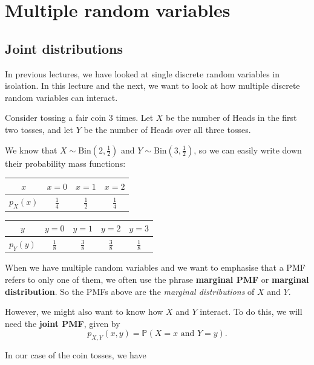 \documentclass[
  a4paper,
]{book}
\theoremstyle{definition}
\theoremstyle{definition}
\theoremstyle{definition}
\theoremstyle{definition}
\theoremstyle{remark}
\begin{document}
\hypertarget{L13-multi-rv}{%
\chapter{Multiple random variables}\label{L13-multi-rv}}

\hypertarget{joint}{%
\section{Joint distributions}\label{joint}}

In previous lectures, we have looked at single discrete random variables in isolation. In this lecture and the next, we want to look at how multiple discrete random variables can interact.

Consider tossing a fair coin 3 times. Let \(X\) be the number of Heads in the first two tosses, and let \(Y\) be the number of Heads over all three tosses.

We know that \(X \sim \text{Bin}(2, \frac12)\) and \(Y \sim \text{Bin}(3, \frac12)\), so we can easily write down their probability mass functions:

\begin{longtable}[]{@{}cccc@{}}
\toprule\noalign{}
\(x\) & \(x = 0\) & \(x = 1\) & \(x = 2\) \\
\midrule\noalign{}
\endhead
\bottomrule\noalign{}
\endlastfoot
\(p_X(x)\) & \(\frac14\) & \(\frac12\) & \(\frac14\) \\
\end{longtable}

\begin{longtable}[]{@{}ccccc@{}}
\toprule\noalign{}
\(y\) & \(y = 0\) & \(y = 1\) & \(y = 2\) & \(y = 3\) \\
\midrule\noalign{}
\endhead
\bottomrule\noalign{}
\endlastfoot
\(p_Y(y)\) & \(\frac18\) & \(\frac38\) & \(\frac38\) & \(\frac18\) \\
\end{longtable}

When we have multiple random variables and we want to emphasise that a PMF refers to only one of them, we often use the phrase \textbf{marginal PMF} or \textbf{marginal distribution}. So the PMFs above are the \emph{marginal distributions} of \(X\) and \(Y\).

However, we might also want to know how \(X\) and \(Y\) interact. To do this, we will need the \textbf{joint PMF}, given by
\[ p_{X,Y}(x,y) = \mathbb P(X = x \text{ and } Y = y) . \]

In our case of the coin tosses, we have
\end{document}
